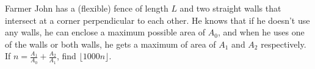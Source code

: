 Farmer John has a (flexible) fence of length $L$ and two straight walls that intersect at a corner perpendicular to each other. He knows that if he doesn't use any walls, he can enclose a maximum possible area of $A_0$, and when he uses one of the walls or both walls, he gets a maximum of area of $A_1$ and $A_2$ respectively. If $n=\frac{A_1}{A_0}+\frac{A_2}{A_1}$, find $\lfloor 1000n\rfloor$.
